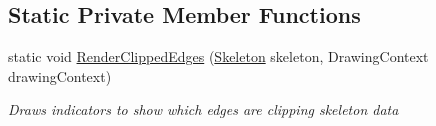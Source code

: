 \subsection*{Static Private Member Functions}
\begin{DoxyCompactItemize}
\item 
static void \hyperlink{classUTKinectSkeletonMovementDetector_1_1MainWindow_af7e8ffb0ba77dd3a298b0f88f7f33cdb}{Render\-Clipped\-Edges} (\hyperlink{classUTKinectSkeletonMovementDetector_1_1MainWindow_aeaae83e3e199c75e2975b19e7f9e881e}{Skeleton} skeleton, Drawing\-Context drawing\-Context)
\begin{DoxyCompactList}\small\item\em Draws indicators to show which edges are clipping skeleton data \end{DoxyCompactList}\end{DoxyCompactItemize}
